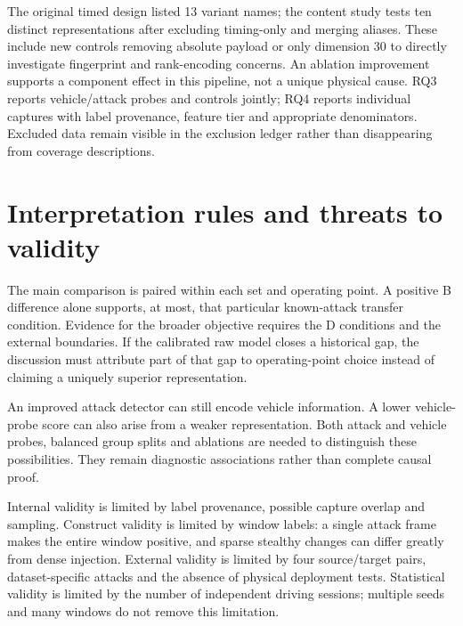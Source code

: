 \documentclass[12pt,a4paper,oneside,openany]{extbook}
\begin{document}
The original timed design listed 13 variant names; the content study tests ten distinct representations after excluding timing-only and merging aliases. These include new controls removing absolute payload or only dimension 30 to directly investigate fingerprint and rank-encoding concerns. An ablation improvement supports a component effect in this pipeline, not a unique physical cause. RQ3 reports vehicle/attack probes and controls jointly; RQ4 reports individual captures with label provenance, feature tier and appropriate denominators. Excluded data remain visible in the exclusion ledger rather than disappearing from coverage descriptions.

\section{Interpretation rules and threats to validity}
The main comparison is paired within each set and operating point. A positive B difference alone supports, at most, that particular known-attack transfer condition. Evidence for the broader objective requires the D conditions and the external boundaries. If the calibrated raw model closes a historical gap, the discussion must attribute part of that gap to operating-point choice instead of claiming a uniquely superior representation.

An improved attack detector can still encode vehicle information. A lower vehicle-probe score can also arise from a weaker representation. Both attack and vehicle probes, balanced group splits and ablations are needed to distinguish these possibilities. They remain diagnostic associations rather than complete causal proof.

Internal validity is limited by label provenance, possible capture overlap and sampling. Construct validity is limited by window labels: a single attack frame makes the entire window positive, and sparse stealthy changes can differ greatly from dense injection. External validity is limited by four source/target pairs, dataset-specific attacks and the absence of physical deployment tests. Statistical validity is limited by the number of independent driving sessions; multiple seeds and many windows do not remove this limitation.
\end{document}
